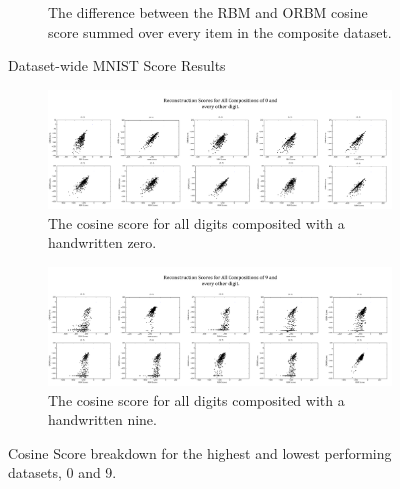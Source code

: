 \begin{figure}[h]
\begin{subfigure}[t]{0.45\textwidth}
      \caption{The difference between the RBM and ORBM cosine score summed over every item in the composite dataset.}
      \label{F:Cosine-MNIST}
  \end{subfigure}
  \caption{Dataset-wide MNIST Score Results }\label{fig:mnist-dataset-wide-results}
\end{figure}

\begin{figure}[h]
    \centering
    \begin{subfigure}[t]{1\textwidth}
        \includegraphics[width=\textwidth]{Assets/b.png}
        \caption{The cosine score for all digits composited with a handwritten zero.  }
      \label{F:Cosine-0-x-scores}
    \end{subfigure}
    \begin{subfigure}[t]{1\textwidth}
        \includegraphics[width=\textwidth]{Assets/(9,X)-ReconstructionScores.png}
        \caption{The cosine score for all digits composited with a handwritten nine.  }
      \label{F:Cosine-9-x-scores}
    \end{subfigure}
    \caption{Cosine Score breakdown for the highest and lowest performing datasets, 0 and 9.}\label{fig:mnist-worse-best-results}
\end{figure}

